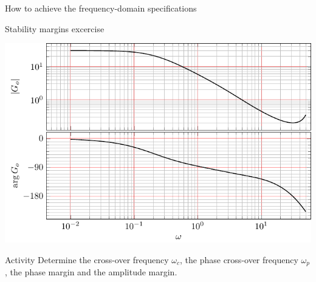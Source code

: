 \documentclass[presentation,aspectratio=169]{beamer}
\begin{document}
\begin{frame}[label={sec:org004fad7}]{How to achieve the frequency-domain specifications}
\end{frame}

\begin{frame}[label={sec:orge655a4e}]{Stability margins excercise}
\begin{center}
  \includegraphics[width=.8\linewidth]{../../figures/bode-example-margin2.pdf}
\end{center}

\alert{Activity} Determine the cross-over frequency \(\omega_c\), the phase cross-over frequency \(\omega_p\), the phase margin and the amplitude margin. 
\end{frame}
\end{document}
